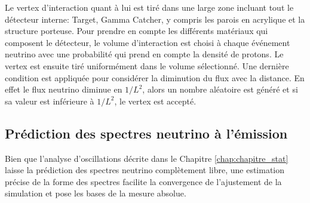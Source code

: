 
Le vertex d'interaction quant à lui est tiré dans une large zone incluant tout le détecteur interne: Target, Gamma Catcher, y compris les parois en acrylique et la structure porteuse. Pour prendre en compte les différents matériaux qui composent le détecteur, le volume d'interaction est choisi à chaque événement neutrino avec une probabilité qui prend en compte la densité de protons. Le vertex est ensuite tiré uniformément dans le volume sélectionné. Une dernière condition est appliquée pour considérer la diminution du flux avec la distance. En effet le flux neutrino diminue en $1/L^2$, alors un nombre aléatoire est généré et si sa valeur est inférieure à $1/L^2$, le vertex est accepté.
%

\subsection{Prédiction des spectres neutrino à l'émission}
\label{sec:nu_emission}

Bien que l'analyse d'oscillations décrite dans le Chapitre \ref{chap:chapitre_stat} laisse la prédiction des spectres neutrino complètement libre, une estimation précise de la forme des spectres facilite la convergence  de l'ajustement de la simulation et pose les bases de la mesure absolue.\\

